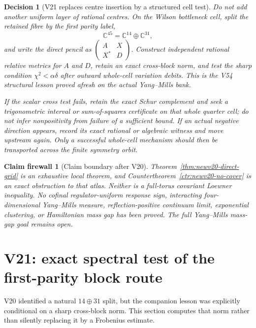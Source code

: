\documentclass[11pt,oneside]{article}
\newtheorem{firewall}[theorem]{Claim firewall}
\newtheorem{decision}[theorem]{Decision}
\theoremstyle{definition}
\theoremstyle{remark}
\begin{document}
\begin{decision}[V21 replaces centre insertion by a structured cell test]
\label{dec:newv20-next}
Do not add another uniform layer of rational centres.  On the
Wilson bottleneck cell, split the retained fibre by the first parity
label,
\[
 \mathbb C^{45}=\mathbb C^{14}\oplus\mathbb C^{31},      \tag{20.13}
\]
and write the direct pencil as
\(\left(\begin{smallmatrix}A&X\\X^*&D\end{smallmatrix}\right)\).
Construct independent rational relative metrics for \(A\) and \(D\),
retain an exact cross-block norm, and test the sharp condition
\(\chi^2<\alpha\delta\) after outward whole-cell variation debits.
This is the V54 structural lesson proved afresh on the actual
Yang--Mills bank.

If the scalar cross test fails, retain the exact Schur complement
and seek a trigonometric interval or sum-of-squares certificate on
that whole quarter cell; do not infer nonpositivity from failure of
a sufficient bound.  If an actual negative direction appears,
record its exact rational or algebraic witness and move upstream
again.  Only a successful whole-cell mechanism should then be
transported across the finite symmetry orbit.
\end{decision}

\begin{firewall}[Claim boundary after V20]
\label{fire:newv20-final}
Theorem~\ref{thm:newv20-direct-grid} is an exhaustive local theorem,
and Countertheorem~\ref{ctr:newv20-no-cover} is an exact obstruction
to that atlas.  Neither is a full-torus covariant Loewner inequality.
No cofinal regulator-uniform response sign, interacting
four-dimensional Yang--Mills measure, reflection-positive continuum
limit, exponential clustering, or Hamiltonian mass gap has been
proved.  The full Yang--Mills mass-gap goal remains open.
\end{firewall}

\section{V21: exact spectral test of the first-parity block route}
\label{sec:newv21-parity-block}

V20 identified a natural \(14\oplus31\) split, but the companion
lesson was explicitly conditional on a sharp cross-block norm.  This
section computes that norm rather than silently replacing it by a
Frobenius estimate.
\end{document}
